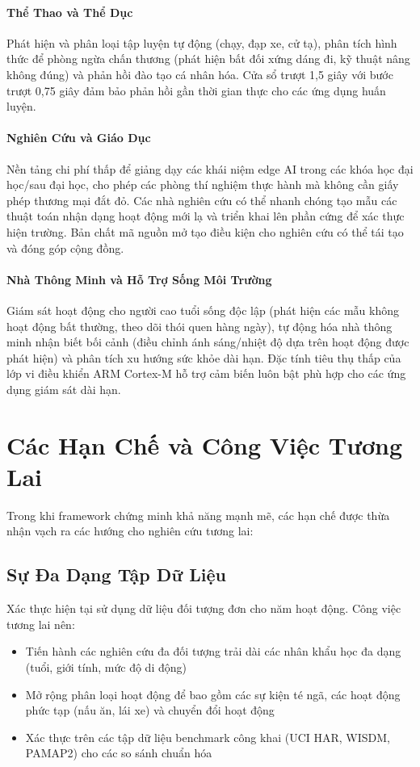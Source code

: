 \paragraph{Thể Thao và Thể Dục}
Phát hiện và phân loại tập luyện tự động (chạy, đạp xe, cử tạ), phân tích hình thức để phòng ngừa chấn thương (phát hiện bất đối xứng dáng đi, kỹ thuật nâng không đúng) và phản hồi đào tạo cá nhân hóa. Cửa sổ trượt 1,5 giây với bước trượt 0,75 giây đảm bảo phản hồi gần thời gian thực cho các ứng dụng huấn luyện.

\paragraph{Nghiên Cứu và Giáo Dục}
Nền tảng chi phí thấp để giảng dạy các khái niệm edge AI trong các khóa học đại học/sau đại học, cho phép các phòng thí nghiệm thực hành mà không cần giấy phép thương mại đắt đỏ. Các nhà nghiên cứu có thể nhanh chóng tạo mẫu các thuật toán nhận dạng hoạt động mới lạ và triển khai lên phần cứng để xác thực hiện trường. Bản chất mã nguồn mở tạo điều kiện cho nghiên cứu có thể tái tạo và đóng góp cộng đồng.

\paragraph{Nhà Thông Minh và Hỗ Trợ Sống Môi Trường}
Giám sát hoạt động cho người cao tuổi sống độc lập (phát hiện các mẫu không hoạt động bất thường, theo dõi thói quen hàng ngày), tự động hóa nhà thông minh nhận biết bối cảnh (điều chỉnh ánh sáng/nhiệt độ dựa trên hoạt động được phát hiện) và phân tích xu hướng sức khỏe dài hạn. Đặc tính tiêu thụ thấp của lớp vi điều khiển ARM Cortex-M hỗ trợ cảm biến luôn bật phù hợp cho các ứng dụng giám sát dài hạn.

\section{Các Hạn Chế và Công Việc Tương Lai}

Trong khi framework chứng minh khả năng mạnh mẽ, các hạn chế được thừa nhận vạch ra các hướng cho nghiên cứu tương lai:

\subsection{Sự Đa Dạng Tập Dữ Liệu}
Xác thực hiện tại sử dụng dữ liệu đối tượng đơn cho năm hoạt động. Công việc tương lai nên:
\begin{itemize}
    \item Tiến hành các nghiên cứu đa đối tượng trải dài các nhân khẩu học đa dạng (tuổi, giới tính, mức độ di động)
    \item Mở rộng phân loại hoạt động để bao gồm các sự kiện té ngã, các hoạt động phức tạp (nấu ăn, lái xe) và chuyển đổi hoạt động
    \item Xác thực trên các tập dữ liệu benchmark công khai (UCI HAR, WISDM, PAMAP2) cho các so sánh chuẩn hóa
\end{itemize}

